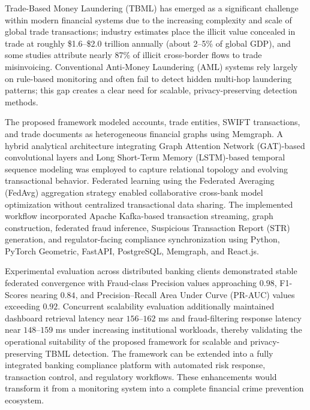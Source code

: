 \vspace{-1cm}

Trade-Based Money Laundering (TBML) has emerged as a significant challenge within modern financial systems due to the increasing complexity and scale of global trade transactions; industry estimates place the illicit value concealed in trade at roughly \$1.6--\$2.0 trillion annually (about 2--5\% of global GDP), and some studies attribute nearly 87\% of illicit cross-border flows to trade misinvoicing. Conventional Anti-Money Laundering (AML) systems rely largely on rule-based monitoring and often fail to detect hidden multi-hop laundering patterns; this gap creates a clear need for scalable, privacy-preserving detection methods.

The proposed framework modeled accounts, trade entities, SWIFT transactions, and trade documents as heterogeneous financial graphs using Memgraph. A hybrid analytical architecture integrating Graph Attention Network (GAT)-based convolutional layers and Long Short-Term Memory (LSTM)-based temporal sequence modeling was employed to capture relational topology and evolving transactional behavior. Federated learning using the Federated Averaging (FedAvg) aggregation strategy enabled collaborative cross-bank model optimization without centralized transactional data sharing. The implemented workflow incorporated Apache Kafka-based transaction streaming, graph construction, federated fraud inference, Suspicious Transaction Report (STR) generation, and regulator-facing compliance synchronization using Python, PyTorch Geometric, FastAPI, PostgreSQL, Memgraph, and React.js.

Experimental evaluation across distributed banking clients demonstrated stable federated convergence with Fraud-class Precision values approaching $0.98$, F1-Scores nearing $0.84$, and Precision--Recall Area Under Curve (PR-AUC) values exceeding $0.92$. Concurrent scalability evaluation additionally maintained dashboard retrieval latency near $156$--$162$ ms and fraud-filtering response latency near $148$--$159$ ms under increasing institutional workloads, thereby validating the operational suitability of the proposed framework for scalable and privacy-preserving TBML detection.
The framework can be extended into a fully integrated banking compliance platform with automated risk response, transaction control, and regulatory workflows. These enhancements would transform it from a monitoring system into a complete financial crime prevention ecosystem.

\pagebreak
